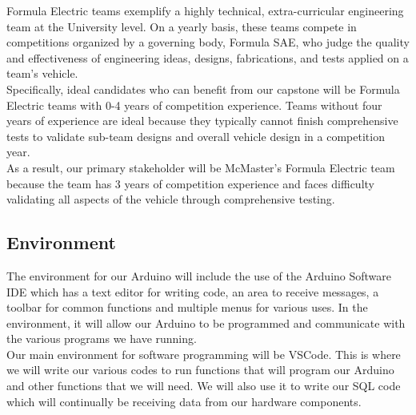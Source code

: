 \documentclass{article}
\begin{document}
Formula Electric teams exemplify a highly technical, extra-curricular engineering team at the University level. On a yearly basis, these teams compete in competitions organized by a governing body, Formula SAE, who judge the quality and effectiveness of engineering ideas, designs, fabrications, and tests applied on a team's vehicle. \\

Specifically, ideal candidates who can benefit from our capstone will be Formula Electric teams with 0-4 years of competition experience. Teams without four years of experience are ideal because they typically cannot finish comprehensive tests to  validate sub-team designs and overall vehicle design in a competition year. \\

As a result, our primary stakeholder will be McMaster's Formula Electric team because the team has 3 years of competition experience and faces difficulty validating all aspects of the vehicle through comprehensive testing.




\subsection{Environment}

The environment for our Arduino will include the use of the Arduino Software IDE which has a text editor for writing code, an area to receive messages, a toolbar for common functions and multiple menus for various uses. In the environment, it will allow our Arduino to be programmed and communicate with the various programs we have running. \\

Our main environment for software programming will be VSCode. This is where we will write our various codes to run functions that will program our Arduino and other functions that we will need. We will also use it to write our SQL code which will continually be receiving data from our hardware components.


\end{document}
